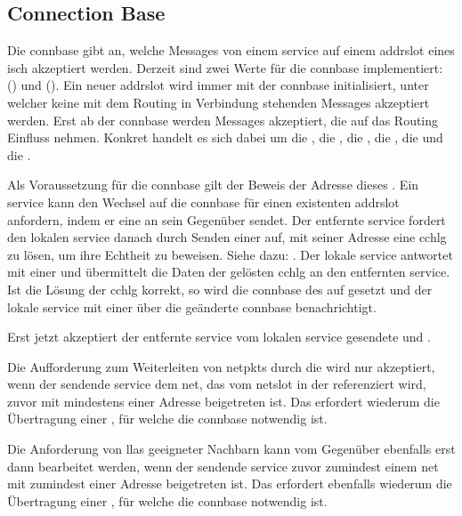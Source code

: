 \subsection{Connection Base}
Die \gls{connbase} gibt an, welche Messages von einem \gls{service} auf einem \gls{addrslot} eines
\gls{isch} akzeptiert werden. Derzeit sind zwei Werte für die \gls{connbase} implementiert:
 () und  ().
Ein neuer \gls{addrslot} wird immer mit der \gls{connbase}  initialisiert, unter
welcher keine mit dem Routing in Verbindung stehenden Messages akzeptiert werden.
Erst ab der \gls{connbase}  werden Messages akzeptiert, die auf
das Routing Einfluss nehmen.
Konkret handelt es sich dabei um die \msg{\isprotonjn}, die \msg{\isprotonln},
die \msg{\isprotonp}, die \msg{\isprotoireq}, die \msg{\isprotoacsa} und die
\msg{\isprotoacd}.

Als Voraussetzung für die \gls{connbase}  gilt der Beweis der Adresse dieses
. Ein \gls{service} kann den Wechsel auf die \gls{connbase}
 für einen existenten \gls{addrslot} anfordern, indem er eine \msg{\isprotots}
an sein Gegenüber sendet.
Der entfernte \gls{service} fordert den lokalen \gls{service} danach durch Senden einer
\msg{\isprotoccreq} auf, mit seiner Adresse eine \gls{cchlg} zu lösen, um ihre Echtheit zu
beweisen. Siehe dazu: .
Der lokale \gls{service} antwortet mit einer \msg{\isprotoccrep} und übermittelt die Daten der
gelösten \gls{cchlg} an den entfernten \gls{service}.
Ist die Lösung der \gls{cchlg} korrekt, so wird die \gls{connbase} des
 auf  gesetzt und der lokale \gls{service} mit
einer \msg{\isprotocbn} über die geänderte \gls{connbase} benachrichtigt.

Erst jetzt akzeptiert der entfernte \gls{service} vom lokalen \gls{service} gesendete
\msgpl{\isprotonjn} und \msgpl{\isprotonln}.

Die Aufforderung zum Weiterleiten von \glspl{netpkt} durch die \msg{\isprotonp} wird nur
akzeptiert, wenn der sendende \gls{service} dem \gls{net}, das vom \gls{netslot} in der
\msg{\isprotonp} referenziert wird, zuvor mit mindestens einer Adresse beigetreten ist.
Das erfordert wiederum die Übertragung einer \msg{\isprotonjn}, für welche die \gls{connbase}
 notwendig ist.

Die Anforderung von \glspl{lla} geeigneter Nachbarn kann vom Gegenüber ebenfalls erst dann
bearbeitet werden, wenn der sendende \gls{service} zuvor zumindest einem \gls{net} mit zumindest
einer Adresse beigetreten ist.
Das erfordert ebenfalls wiederum die Übertragung einer \msg{\isprotonjn}, für welche die
\gls{connbase}  notwendig ist.


